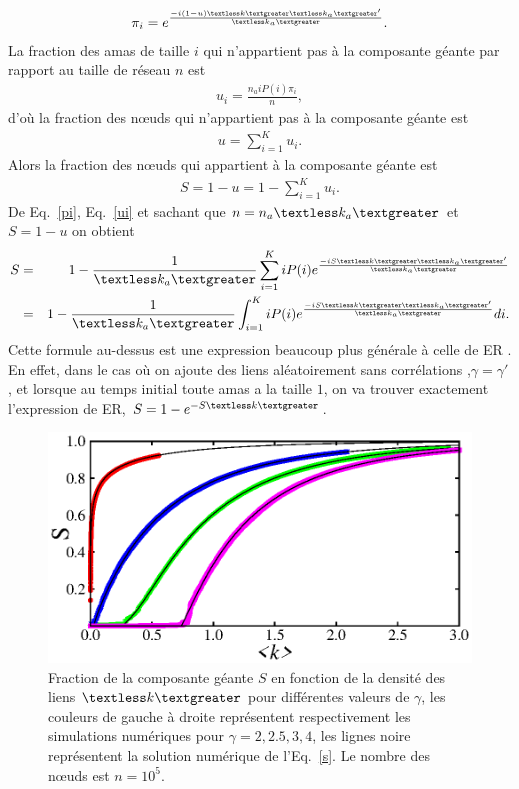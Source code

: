 \begin{eqnarray}
\pi_{i}=e^{\frac{-i(1-u)\km\kma'}{\kma}}.
\label{pi}
\end{eqnarray}
La fraction des amas de taille $i$ qui n'appartient pas à la composante géante par rapport au taille de réseau $n$ est 
\begin{eqnarray}
u_{i}=\frac{n_aiP(i)\pi_i}{n},
\label{ui}
\end{eqnarray}
d'où la fraction des nœuds qui  n'appartient pas  à la composante géante est
\begin{eqnarray}
u=\sum_{i=1}^K u_i.
\end{eqnarray}
Alors la fraction des nœuds qui appartient à la composante géante est 
\begin{eqnarray}
S=1-u=1-\sum_{i=1}^K u_i.
\end{eqnarray}
De Eq.~\eqref{pi}, Eq.~\eqref{ui} et sachant que $n=n_a\kma$ et $S=1-u$ on obtient
\begin{eqnarray}
S&=&1-\frac{1}{\kma}\sum_{i=1}^KiP(i)e^{\frac{-iS\km\kma'}{\kma}}\nonumber \\
&=& 1-\frac{1}{\kma}\int_{i=1}^KiP(i)e^{\frac{-iS\km\kma'}{\kma}}di.
\label{s}
\end{eqnarray}
 Cette formule au-dessus est une expression beaucoup plus générale à celle de ER \cite{Erdos-Renyi1959}. En effet, dans le cas où on ajoute des liens aléatoirement sans corrélations ,$\gamma=\gamma'$, et lorsque au temps initial toute amas a la taille $1$, on va trouver exactement l'expression de ER, $S=1-e^{-S\km}$.
  \begin{figure}[h!]
  	\centering
  	\includegraphics[scale=1.2]{./figures/fig-CG}
  	\caption{Fraction de la composante géante $S$ en fonction de la densité des liens $\km$ pour différentes valeurs de $\gamma$, les couleurs de gauche à droite représentent  respectivement les simulations numériques pour $\gamma=2,2.5,3,4$, les lignes noire représentent la solution numérique de l'Eq.~\eqref{s}. Le nombre des nœuds est $n=10^5$.}
  	\label{CG}
  \end{figure}
 
